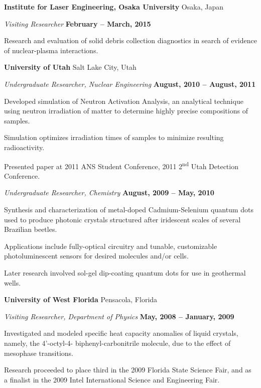 {\bf  Institute for Laser Engineering, Osaka University} \hfill{ Osaka, Japan}

\vspace*{-.05in}
{\em Visiting Researcher} \hfill {\bf February -- March,  2015}

\begin{list2}
\item    Research and evaluation of solid debris collection diagnostics in search of evidence of nuclear-plasma interactions.
\end{list2}







{\bf University of Utah} \hfill{ Salt Lake City, Utah}

\vspace*{-.05in}
{\em Undergraduate Researcher, Nuclear Engineering} \hfill {\bf August, 2010 -- August, 2011}

\begin{list2}
\item Developed simulation of Neutron Activation Analysis, an analytical technique using neutron
irradiation of matter to determine highly precise compositions of samples.
\item Simulation optimizes irradiation times of samples to minimize resulting radioactivity.
\item Presented paper at 2011 ANS Student Conference, 2011 2\textsuperscript{nd} Utah
Detection Conference.
\end{list2}


{\em Undergraduate Researcher, Chemistry} \hfill {\bf August, 2009 -- May, 2010}

\begin{list2}
\item  Synthesis and characterization of metal-doped Cadmium-Selenium quantum dots used to produce
photonic crystals structured after iridescent scales of several Brazilian beetles.
\item  Applications include fully-optical circuitry and tunable, customizable photoluminescent sensors for
desired molecules and/or cells.
\item  Later research involved sol-gel dip-coating quantum dots for use in geothermal wells.
\end{list2}

{\bf University of West Florida} \hfill{ Pensacola, Florida}

\vspace*{-.05in}
{\em  Visiting Researcher, Department of Physics} \hfill {\bf May, 2008 -- January, 2009}

\begin{list2}
\item  Investigated and modeled specific heat capacity anomalies of liquid crystals, namely, the 4'-octyl-4-
biphenyl-carbonitrile molecule, due to the effect of mesophase transitions.
\item  Research proceeded to place third in the 2009 Florida State Science Fair, and as a finalist in the
2009 Intel International Science and Engineering Fair.
\end{list2}